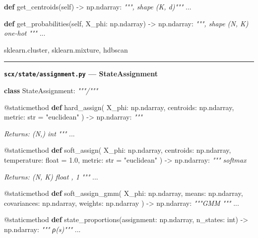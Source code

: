 \documentclass[
  12pt,
]{article}
\newenvironment{Shaded}{}{}
\newcommand{\AttributeTok}[1]{\textcolor[rgb]{0.49,0.56,0.16}{#1}}
\newcommand{\BuiltInTok}[1]{\textcolor[rgb]{0.00,0.50,0.00}{#1}}
\newcommand{\CommentTok}[1]{\textcolor[rgb]{0.38,0.63,0.69}{\textit{#1}}}
\newcommand{\FloatTok}[1]{\textcolor[rgb]{0.25,0.63,0.44}{#1}}
\newcommand{\KeywordTok}[1]{\textcolor[rgb]{0.00,0.44,0.13}{\textbf{#1}}}
\newcommand{\NormalTok}[1]{#1}
\newcommand{\OperatorTok}[1]{\textcolor[rgb]{0.40,0.40,0.40}{#1}}
\newcommand{\StringTok}[1]{\textcolor[rgb]{0.25,0.44,0.63}{#1}}
\newcommand{\VariableTok}[1]{\textcolor[rgb]{0.10,0.09,0.49}{#1}}
\begin{document}
\begin{Shaded}
\begin{Highlighting}[]
    \KeywordTok{def}\NormalTok{ get\_centroids(}\VariableTok{self}\NormalTok{) }\OperatorTok{{-}\textgreater{}}\NormalTok{ np.ndarray:}
        \CommentTok{""", shape (K, d)"""}
\NormalTok{        ...}

    \KeywordTok{def}\NormalTok{ get\_probabilities(}\VariableTok{self}\NormalTok{, X\_phi: np.ndarray) }\OperatorTok{{-}\textgreater{}}\NormalTok{ np.ndarray:}
        \CommentTok{""", shape (N, K)}
\CommentTok{         one{-}hot }
\CommentTok{        """}
\NormalTok{        ...}
\end{Highlighting}
\end{Shaded}

sklearn.cluster, sklearn.mixture, hdbscan

\begin{center}\rule{0.5\linewidth}{0.5pt}\end{center}

\textbf{\texttt{scx/state/assignment.py} --- StateAssignment}



\begin{Shaded}
\begin{Highlighting}[]
\KeywordTok{class}\NormalTok{ StateAssignment:}
    \CommentTok{"""/"""}

    \AttributeTok{@staticmethod}
    \KeywordTok{def}\NormalTok{ hard\_assign(}
\NormalTok{        X\_phi: np.ndarray,}
\NormalTok{        centroids: np.ndarray,}
\NormalTok{        metric: }\BuiltInTok{str} \OperatorTok{=} \StringTok{"euclidean"}
\NormalTok{    ) }\OperatorTok{{-}\textgreater{}}\NormalTok{ np.ndarray:}
        \CommentTok{"""}

\CommentTok{        Returns: (N,) int }
\CommentTok{        """}
\NormalTok{        ...}

    \AttributeTok{@staticmethod}
    \KeywordTok{def}\NormalTok{ soft\_assign(}
\NormalTok{        X\_phi: np.ndarray,}
\NormalTok{        centroids: np.ndarray,}
\NormalTok{        temperature: }\BuiltInTok{float} \OperatorTok{=} \FloatTok{1.0}\NormalTok{,}
\NormalTok{        metric: }\BuiltInTok{str} \OperatorTok{=} \StringTok{"euclidean"}
\NormalTok{    ) }\OperatorTok{{-}\textgreater{}}\NormalTok{ np.ndarray:}
        \CommentTok{""" softmax }

\CommentTok{        Returns: (N, K) float ,  1}
\CommentTok{        """}
\NormalTok{        ...}

    \AttributeTok{@staticmethod}
    \KeywordTok{def}\NormalTok{ soft\_assign\_gmm(}
\NormalTok{        X\_phi: np.ndarray,}
\NormalTok{        means: np.ndarray,}
\NormalTok{        covariances: np.ndarray,}
\NormalTok{        weights: np.ndarray}
\NormalTok{    ) }\OperatorTok{{-}\textgreater{}}\NormalTok{ np.ndarray:}
        \CommentTok{"""GMM """}
\NormalTok{        ...}

    \AttributeTok{@staticmethod}
    \KeywordTok{def}\NormalTok{ state\_proportions(assignment: np.ndarray, n\_states: }\BuiltInTok{int}\NormalTok{) }\OperatorTok{{-}\textgreater{}}\NormalTok{ np.ndarray:}
        \CommentTok{""" ρ(s)"""}
\NormalTok{        ...}
\end{Highlighting}
\end{Shaded}
\end{document}

